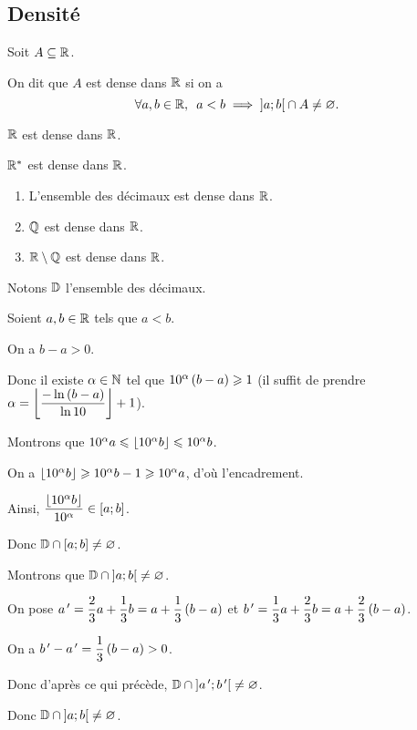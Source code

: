 \subsection{Densité}

\begin{defi}
Soit \(A\subseteq\mathbb{R}\).

On dit que \(A\) est dense dans \(\mathbb{R}\) si on a \[\quantifs{\forall a,b\in\R}a<b\imp\intervee{a}{b}\inter A\not=\ensvide.\]
\end{defi}

\begin{ex}
\(\mathbb{R}\) est dense dans \(\mathbb{R}\).

\(\mathbb{R}^*\) est dense dans \(\mathbb{R}\).
\end{ex}

\begin{prop}
\begin{enumerate}
\item L'ensemble des décimaux est dense dans \(\mathbb{R}\). \\

\item \(\mathbb{Q}\) est dense dans \(\mathbb{R}\). \\

\item \(\mathbb{R}\setminus\mathbb{Q}\) est dense dans \(\mathbb{R}\). \\
\end{enumerate}
\end{prop}

\begin{dem}[1]
Notons \(\mathbb{D}\) l'ensemble des décimaux.

Soient \(a,b\in\mathbb{R}\) tels que \(a<b\).

On a \(b-a>0\).

Donc il existe \(\alpha\in\mathbb{N}\) tel que \(10^\alpha\left(b-a\right)\geqslant1\) (il suffit de prendre \(\alpha=\left\lfloor\dfrac{-\ln\left(b-a\right)}{\ln10}\right\rfloor+1\)).

Montrons que \(10^\alpha a\leqslant\left\lfloor10^\alpha b\right\rfloor\leqslant10^\alpha b\).

On a \(\left\lfloor10^\alpha b\right\rfloor\geqslant10^\alpha b-1\geqslant10^\alpha a\), d'où l'encadrement.

Ainsi, \(\dfrac{\left\lfloor10^\alpha b\right\rfloor}{10^\alpha}\in\left[a;b\right]\).

Donc \(\mathbb{D}\cap\left[a;b\right]\not=\varnothing\).

Montrons que \(\mathbb{D}\cap\left]a;b\right[\not=\varnothing\).

On pose \(a^{\,\prime}=\dfrac{2}{3}a+\dfrac{1}{3}b=a+\dfrac{1}{3}\left(b-a\right)\) et \(b^{\,\prime}=\dfrac{1}{3}a+\dfrac{2}{3}b=a+\dfrac{2}{3}\left(b-a\right)\).

On a \(b^{\,\prime}-a^{\,\prime}=\dfrac{1}{3}\left(b-a\right)>0\).

Donc d'après ce qui précède, \(\mathbb{D}\cap\left]a^{\,\prime};b^{\,\prime}\right[\not=\varnothing\).

Donc \(\mathbb{D}\cap\left]a;b\right[\not=\varnothing\).
\end{dem}

